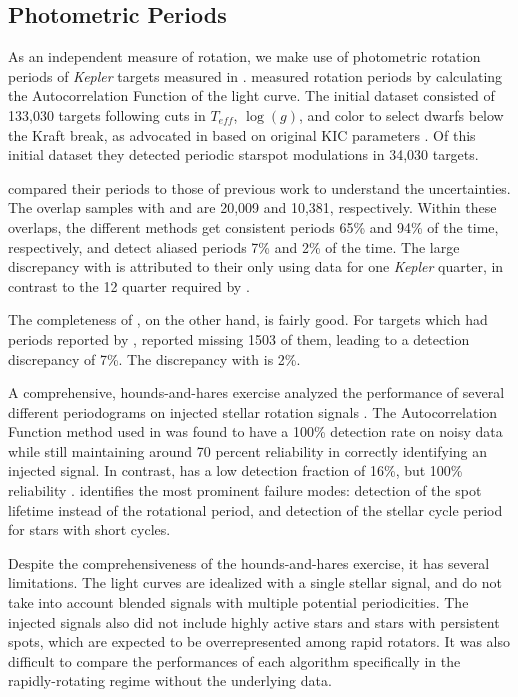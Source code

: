 \documentclass[manuscript]{aastex6}
\newcommand{\Kepler}{\mbox{\textit{Kepler}}}
\newcommand{\Teff}{\ensuremath{T_{eff}}}
\newcommand{\logg}{\ensuremath{\log(g)}}
\begin{document}
\subsection{Photometric Periods}

As an independent measure of rotation, we make use of photometric rotation
periods of \Kepler{} targets measured in \citet{McQuillan14}.
\citet{McQuillan14} measured rotation periods by calculating the 
Autocorrelation Function of the light curve. The initial dataset 
consisted of 133,030 targets following cuts in \Teff, \logg, and color to
select dwarfs below the Kraft break, as advocated in 
\citet{Ciardi11} based on original KIC parameters \citep{Brown11}. Of this
initial dataset they detected periodic starspot modulations in 34,030 targets.

\citet{McQuillan14} compared their periods to those of previous work
\citep{Reinhold13,Nielsen13} to understand the uncertainties. The overlap 
samples with \citet{Reinhold13} and \citet{Nielsen13} are 20,009 and 10,381,
respectively. Within these overlaps, the different methods get
consistent periods 65\% and 94\% of the time, respectively, and detect
aliased periods 7\% and 2\% of the time. The large discrepancy with
\citet{Reinhold13} is attributed to their only using data for one
\Kepler{} quarter, in contrast to the 12 quarter required by 
\citet{McQuillan14}.

The completeness of \citet{McQuillan14}, on the other hand, is fairly
good. For targets which had periods reported by \citet{Reinhold13},
\citet{McQuillan14} reported missing 1503 of them, leading to a
detection
discrepancy of 7\%. The discrepancy with \citet{Nielsen13} is 2\%.

A comprehensive, hounds-and-hares exercise analyzed the performance of
several different periodograms on injected stellar rotation signals 
\citep{Aigrain15}. The Autocorrelation Function method used in 
\citet{McQuillan14} was found to have a 100\% detection rate on noisy
data while still maintaining around 70 percent reliability in correctly
identifying an injected signal. In contrast, \citet{Nielsen13} has a
low
detection fraction of 16\%, but 100\% reliability \citep{Aigrain15}.
\citet{Aigrain15} identifies the most prominent failure modes:
detection
of the spot lifetime instead of the rotational period, and detection of
the stellar cycle period for stars with short cycles.

Despite the comprehensiveness of the hounds-and-hares exercise, it has
several limitations. The light curves are idealized with a single
stellar signal, and do not take into account blended signals with
multiple potential periodicities. The injected signals also did not
include highly active stars and stars with persistent spots, which are
expected to be overrepresented among rapid rotators. It was also
difficult to compare the performances of each algorithm specifically in
the rapidly-rotating regime without the underlying data.
\end{document}
